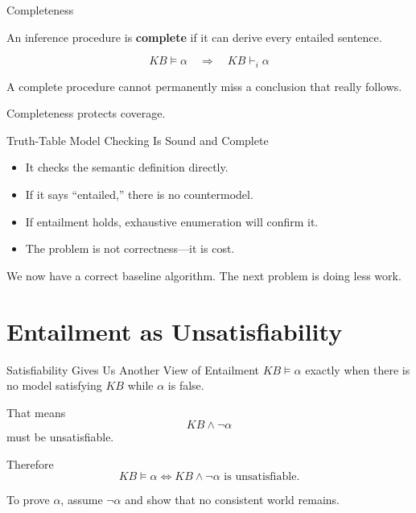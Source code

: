 \documentclass[aspectratio=169,10pt]{beamer}
\begin{document}
\begin{frame}[shrink=12]{Completeness}
  \begin{cpdefinition}
    An inference procedure is \textbf{complete} if it can derive every entailed sentence.
  \end{cpdefinition}

  \[
    KB\models\alpha \quad\Rightarrow\quad KB\vdash_i\alpha
  \]

  A complete procedure cannot permanently miss a conclusion that really follows.

  \begin{keyidea}
    Completeness protects coverage.
  \end{keyidea}
\end{frame}

\begin{frame}[shrink=12]{Truth-Table Model Checking Is Sound and Complete}
  \begin{itemize}
    \item It checks the semantic definition directly.
    \item If it says ``entailed,'' there is no countermodel.
    \item If entailment holds, exhaustive enumeration will confirm it.
    \item The problem is not correctness---it is cost.
  \end{itemize}

  \begin{keyidea}
    We now have a correct baseline algorithm. The next problem is doing less work.
  \end{keyidea}
\end{frame}

\section{Entailment as Unsatisfiability}

\begin{frame}[shrink=12]{Satisfiability Gives Us Another View of Entailment}
  $KB\models\alpha$ exactly when there is no model satisfying $KB$ while $\alpha$ is false.

  That means
  \[
    KB\land\neg\alpha
  \]
  must be unsatisfiable.

  Therefore
  \[
    \boxed{KB\models\alpha \iff KB\land\neg\alpha\text{ is unsatisfiable}.}
  \]

  \begin{keyidea}
    To prove $\alpha$, assume $\neg\alpha$ and show that no consistent world remains.
  \end{keyidea}
\end{frame}
\end{document}

